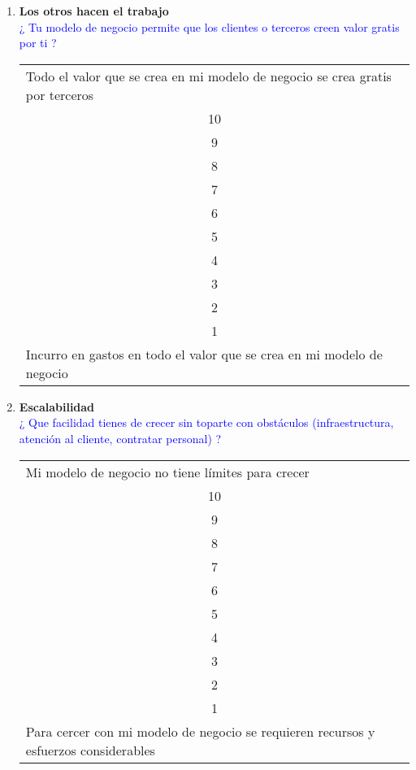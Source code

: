 \documentclass[11pt]{book}
\begin{document}
\begin{enumerate}
\item \textbf{ Los otros hacen el trabajo }\\
\textcolor{blue}{¿ Tu modelo de negocio permite que los clientes o terceros creen valor gratis por ti ? }

\begin{table}[htbp]
  \centering

    \begin{tabular}{p{11em}}
    Todo el valor que se crea en mi modelo de negocio se crea gratis por terceros \\
    \multicolumn{1}{c}{10} \\
    \multicolumn{1}{c}{9} \\
    \multicolumn{1}{c}{8} \\
    \multicolumn{1}{c}{7} \\
    \multicolumn{1}{c}{6} \\
    \multicolumn{1}{c}{5} \\
    \multicolumn{1}{c}{4} \\
    \multicolumn{1}{c}{3} \\
    \multicolumn{1}{c}{2} \\
    \multicolumn{1}{c}{1} \\
    Incurro en gastos en todo el valor que se crea en mi modelo de negocio \\
    \end{tabular}%
  \label{tab:addlabel}%
\end{table}%


\item \textbf{ Escalabilidad }\\
\textcolor{blue}{¿ Que facilidad tienes de crecer sin toparte con obstáculos (infraestructura, atención al cliente, contratar personal) ?}
\begin{table}[htbp]
  \centering

    \begin{tabular}{p{12.855em}}
    Mi modelo de negocio no tiene límites para crecer \\
    \multicolumn{1}{c}{10} \\
    \multicolumn{1}{c}{9} \\
    \multicolumn{1}{c}{8} \\
    \multicolumn{1}{c}{7} \\
    \multicolumn{1}{c}{6} \\
    \multicolumn{1}{c}{5} \\
    \multicolumn{1}{c}{4} \\
    \multicolumn{1}{c}{3} \\
    \multicolumn{1}{c}{2} \\
    \multicolumn{1}{c}{1} \\
    Para cercer con mi modelo de negocio se requieren recursos y esfuerzos considerables \\
    \end{tabular}%
  \label{tab:addlabel}%
\end{table}%


\end{enumerate}
\end{document}
